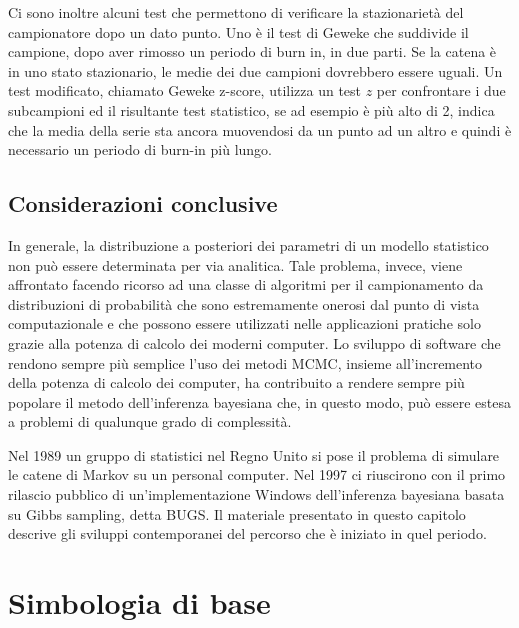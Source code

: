 \documentclass[
  11pt,
]{krantz}
\theoremstyle{definition}
\theoremstyle{definition}
\theoremstyle{definition}
\theoremstyle{definition}
\theoremstyle{remark}
\begin{document}
Ci sono inoltre alcuni test che permettono di verificare la stazionarietà del campionatore dopo un dato punto. Uno è il test di Geweke che suddivide il campione, dopo aver rimosso un periodo di burn in, in due parti. Se la catena è in uno stato stazionario, le medie dei due campioni dovrebbero essere uguali. Un test modificato, chiamato Geweke z-score, utilizza un test \(z\) per confrontare i due subcampioni ed il risultante test statistico, se ad esempio è più alto di 2, indica che la media della serie sta ancora muovendosi da un punto ad un altro e quindi è necessario un periodo di burn-in più lungo.

\hypertarget{considerazioni-conclusive-1}{%
\section*{Considerazioni conclusive}\label{considerazioni-conclusive-1}}


In generale, la distribuzione a posteriori dei parametri di un modello statistico non può essere determinata per via analitica. Tale problema, invece, viene affrontato facendo ricorso ad una classe di algoritmi per il campionamento da distribuzioni di probabilità che sono estremamente onerosi dal punto di vista computazionale e che possono essere utilizzati nelle applicazioni pratiche solo grazie alla potenza di calcolo dei moderni computer. Lo sviluppo di software che rendono sempre più semplice l'uso dei metodi MCMC, insieme all'incremento della potenza di calcolo dei computer, ha contribuito a rendere sempre più popolare il metodo dell'inferenza bayesiana che, in questo modo, può essere estesa a problemi di qualunque grado di complessità.

Nel 1989 un gruppo di statistici nel Regno Unito si pose il problema di simulare le catene di Markov su un personal computer. Nel 1997 ci riuscirono con il primo rilascio pubblico di un'implementazione Windows dell'inferenza bayesiana basata su Gibbs sampling, detta BUGS. Il materiale presentato in questo capitolo descrive gli sviluppi contemporanei del percorso che è iniziato in quel periodo.

\mainmatter

\hypertarget{appendix-appendix}{%
\appendix {}}


\hypertarget{simbologia-di-base}{%
\chapter{Simbologia di base}\label{simbologia-di-base}}
\end{document}
